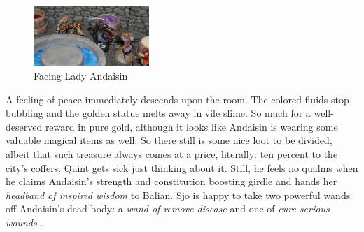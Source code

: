 \begin{figure}[h]
	\centering
	\includegraphics[width=0.39\textwidth]{images/Facing-Lady-Andaisin-523052184.jpg}
	\caption{Facing Lady Andaisin}
	\label{fig:Facing-Lady-Andaisin-523052184}
\end{figure}

A feeling of peace immediately descends upon the room. The colored fluids stop bubbling and the golden statue melts away in vile slime. So much for a well-deserved reward in pure gold, although it looks like Andaisin is wearing some valuable magical items as well. So there still is some nice loot to be divided, albeit that such treasure always comes at a price, literally: ten percent to the city's coffers. Quint gets sick just thinking about it. Still, he feels no qualms when he claims Andaisin's strength and constitution boosting girdle and hands her {\itshape headband of inspired wisdom} to Balian. Sjo is happy to take two powerful wands off Andaisin's dead body: a  {\itshape wand of remove disease} and one of  {\itshape cure serious wounds} . 